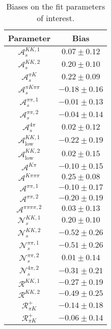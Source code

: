 \begin{table}
  \centering
  \begin{tabular}{cc}
  \toprule
      Parameter & Bias \\
  \midrule
      $\mathcal{A}_s^{KK,1}$ & $0.07 \pm 0.12$ \\
      $\mathcal{A}_s^{KK,2}$ & $0.20 \pm 0.10$ \\
      $\mathcal{A}_s^{\pi K}$ & $0.22 \pm 0.09$ \\
      $\mathcal{A}_s^{\pi K\pi\pi}$ & $-0.18 \pm 0.16$ \\
      $\mathcal{A}_s^{\pi\pi,1}$ & $-0.01 \pm 0.13$ \\
      $\mathcal{A}_s^{\pi\pi,2}$ & $-0.04 \pm 0.14$ \\
      $\mathcal{A}_s^{4\pi}$ & $0.02 \pm 0.12$ \\
      $\mathcal{A}_\mathrm{low}^{KK,1}$ & $-0.22 \pm 0.19$ \\
      $\mathcal{A}_\mathrm{low}^{KK,2}$ & $0.02 \pm 0.15$ \\
      $\mathcal{A}^{K\pi}$ & $-0.10 \pm 0.15$ \\
      $\mathcal{A}^{K\pi\pi\pi}$ & $0.25 \pm 0.08$ \\
      $\mathcal{A}^{\pi\pi,1}$ & $-0.10 \pm 0.17$ \\
      $\mathcal{A}^{\pi\pi,2}$ & $-0.20 \pm 0.19$ \\
      $\mathcal{A}^{\pi\pi\pi\pi,2}$ & $0.03 \pm 0.13$ \\
      $\mathcal{N}_s^{KK,1}$ & $0.20 \pm 0.10$ \\
      $\mathcal{N}_s^{KK,2}$ & $-0.52 \pm 0.26$ \\
      $\mathcal{N}_s^{\pi\pi,1}$ & $-0.51 \pm 0.26$ \\
      $\mathcal{N}_s^{\pi\pi,2}$ & $0.01 \pm 0.14$ \\
      $\mathcal{N}_s^{4\pi,2}$ & $-0.31 \pm 0.21$ \\
      $\mathcal{R}^{KK,1}$ & $-0.27 \pm 0.19$ \\
      $\mathcal{R}^{KK,2}$ & $-0.49 \pm 0.25$ \\
      $\mathcal{R}_{\pi K}^+$ & $-0.14 \pm 0.18$ \\
      $\mathcal{R}_{\pi K}^+$ & $-0.06 \pm 0.14$ \\
      \bottomrule
  \end{tabular}
  \caption{Biases on the fit parameters of interest.}
\label{tab:biases}
\end{table}
